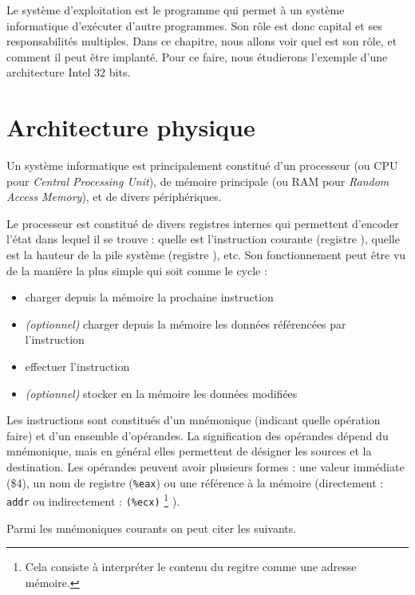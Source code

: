 Le système d'exploitation est le programme qui permet à un système informatique
d'exécuter d'autre programmes. Son rôle est donc capital et ses responsabilités
multiples. Dans ce chapitre, nous allons voir quel est son rôle, et comment il
peut être implanté. Pour ce faire, nous étudierons l'exemple d'une architecture
Intel 32 bits.

\section{Architecture physique}

Un système informatique est principalement constitué d'un processeur (ou CPU
pour \emph{Central Processing Unit}), de mémoire principale (ou RAM pour
\emph{Random Access Memory}), et de divers périphériques.

Le processeur est constitué de divers registres internes qui permettent
d'encoder l'état dans lequel il se trouve : quelle est l'instruction courante
(registre \eip), quelle est la hauteur de la pile système (registre \esp), etc.
Son fonctionnement peut être vu de la manière la plus simple qui soit comme le
cycle :

\begin{itemize}
\item
  charger depuis la mémoire la prochaine instruction
\item
  \emph{(optionnel)} charger depuis la mémoire les données référencées
  par l'instruction
\item
  effectuer l'instruction
\item
  \emph{(optionnel)} stocker en la mémoire les données modifiées
\end{itemize}

Les instructions sont constitués d'un mnémonique (indicant quelle opération
faire) et d'un ensemble d'opérandes. La signification des opérandes dépend du
mnémonique, mais en général elles permettent de désigner les sources et la
destination. Les opérandes peuvent avoir plusieurs formes : une valeur
immédiate (\$4), un nom de registre (\texttt{\%eax}) ou une référence à la
mémoire (directement : \texttt{addr} ou indirectement : \texttt{(\%ecx)}
\footnote{
  Cela consiste à interpréter le contenu du regitre \ecx comme une adresse
  mémoire.
}
).

Parmi les mnémoniques courants on peut citer les suivants.

